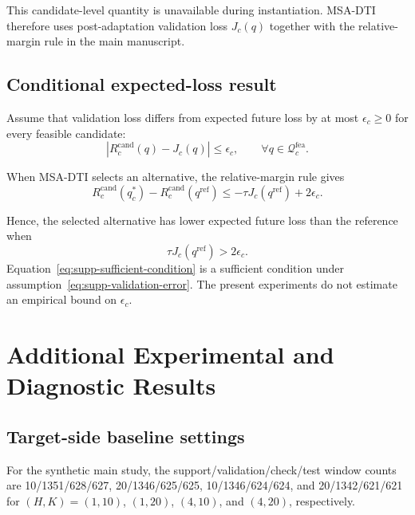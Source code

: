 \documentclass[11pt,a4paper]{article}
\begin{document}
This candidate-level quantity is unavailable during instantiation. MSA-DTI
therefore uses post-adaptation validation loss $J_c(q)$ together with the
relative-margin rule in the main manuscript.

\subsection{Conditional expected-loss result}

Assume that validation loss differs from expected future loss by at most
$\epsilon_c\geq0$ for every feasible candidate:
\begin{equation}
\left|
R_c^{\mathrm{cand}}(q)-J_c(q)
\right|
\leq
\epsilon_c,
\qquad
\forall q\in\mathcal{Q}_{c}^{\mathrm{fea}}.
\label{eq:supp-validation-error}
\end{equation}

When MSA-DTI selects an alternative, the relative-margin rule gives
\begin{equation}
R_c^{\mathrm{cand}}(q_c^{*})
-
R_c^{\mathrm{cand}}(q^{\mathrm{ref}})
\leq
-\tau J_c(q^{\mathrm{ref}})
+
2\epsilon_c.
\label{eq:supp-expected-loss}
\end{equation}

Hence, the selected alternative has lower expected future loss than the
reference when
\begin{equation}
\tau J_c(q^{\mathrm{ref}})>2\epsilon_c.
\label{eq:supp-sufficient-condition}
\end{equation}
Equation~\eqref{eq:supp-sufficient-condition} is a sufficient condition under
assumption~\eqref{eq:supp-validation-error}. The present experiments do not
estimate an empirical bound on $\epsilon_c$.

\section{Additional Experimental and Diagnostic Results}
\label{supp:diagnostics}



\subsection{Target-side baseline settings}

For the synthetic main study, the support/validation/check/test window counts
are 10/1351/628/627, 20/1346/625/625, 10/1346/624/624, and
20/1342/621/621 for $(H,K)=(1,10)$, $(1,20)$, $(4,10)$, and $(4,20)$,
respectively.
\end{document}
